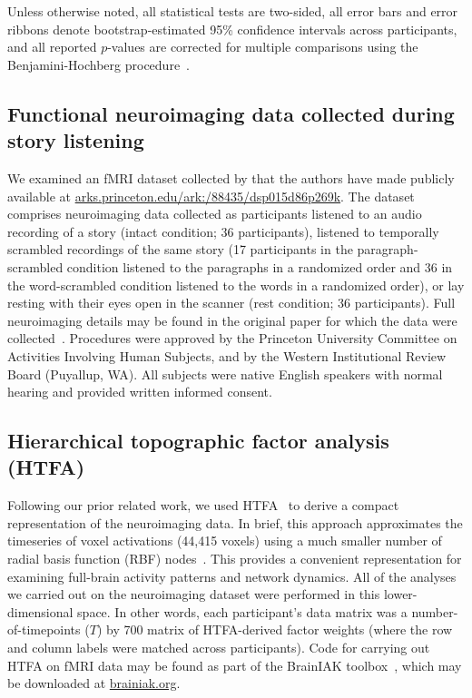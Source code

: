 \documentclass[english, 11pt]{article}
\begin{document}
Unless otherwise noted, all statistical tests are two-sided, all error bars and
error ribbons denote bootstrap-estimated 95\% confidence intervals across
participants, and all reported $p$-values are corrected for multiple
comparisons using the Benjamini-Hochberg procedure~\citep{BenjHoch95}.

\subsection*{Functional neuroimaging data collected during story
  listening}

We examined an fMRI dataset collected by \cite{SimoEtal16} that the authors
have made publicly available at
\href{http://arks.princeton.edu/ark:/88435/dsp015d86p269k}{arks.princeton.edu/ark:/88435/dsp015d86p269k}.
The dataset comprises neuroimaging data collected as participants listened to
an audio recording of a story (intact condition; 36 participants), listened to
temporally scrambled recordings of the same story (17 participants in the
paragraph-scrambled condition listened to the paragraphs in a randomized order
and 36 in the word-scrambled condition listened to the words in a randomized
order), or lay resting with their eyes open in the scanner (rest condition; 36
participants). Full neuroimaging details may be found in the original paper for
which the data were collected~\citep{SimoEtal16}. Procedures were approved by
the Princeton University Committee on Activities Involving Human Subjects, and
by the Western Institutional Review Board (Puyallup, WA). All subjects were
native English speakers with normal hearing and provided written informed
consent.

\subsection*{Hierarchical topographic factor analysis (HTFA)}

Following our prior related work, we used HTFA~\citep{MannEtal18} to derive a
compact representation of the neuroimaging data. In brief, this approach
approximates the timeseries of voxel activations (44,415 voxels) using a much
smaller number of radial basis function (RBF) nodes~\citep[in this case, 700
nodes, as determined by an optimization procedure;][]{MannEtal18}. This
provides a convenient representation for examining full-brain activity patterns
and network dynamics. All of the analyses we carried out on the neuroimaging
dataset were performed in this lower-dimensional space. In other words, each
participant's data matrix was a number-of-timepoints ($T$) by 700 matrix of
HTFA-derived factor weights (where the row and column labels were matched
across participants). Code for carrying out HTFA on fMRI data may be found as
part of the BrainIAK toolbox~\citep{CapoEtal17, KumaEtal21}, which may be
downloaded at \href{https://brainiak.org/}{brainiak.org}.
\end{document}
